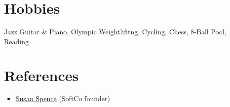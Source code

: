 \documentclass[letterpaper,11pt]{article}
\makeatletter
\newcommand{\resumeItem}[1]{
  \item\small{
    {#1 \vspace{-2pt}}
  }
}
\newcommand{\resumeProjectHeading}[2]{
    \vspace{-2pt}\item
    \begin{tabular*}{0.97\textwidth}{l@{\extracolsep{\fill}}r}
      \small#1 & #2 \\
    \end{tabular*}\vspace{-7pt}
}
\newcommand{\resumeSubHeadingListStart}{\begin{itemize}[leftmargin=0.15in, label={}]}
\newcommand{\resumeSubHeadingListEnd}{\end{itemize}}
\newcommand{\resumeItemListStart}{\begin{itemize}}
\newcommand{\resumeItemListEnd}{\end{itemize}\vspace{-5pt}}
\makeatother
\begin{document}

      
      
      
      






\section{Hobbies}
  \resumeSubHeadingListStart
  \small{\item{Jazz Guitar \& Piano, Olympic Weightlifitng, Cycling, Chess, 8-Ball Pool, Reading}}
  \resumeSubHeadingListEnd



\section{References}
  \vspace{2pt}
  \resumeSubHeadingListStart
  \item{\href{susan.spence7@gmail.com}{Susan Spence} (SoftCo founder)}
   \resumeSubHeadingListEnd



\end{document}
